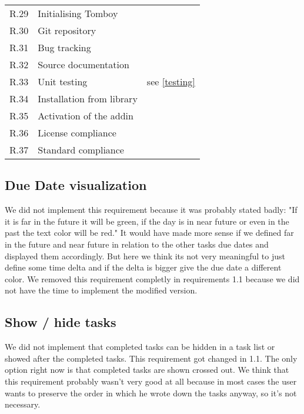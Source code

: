 \begin{tabular}{lll}
\completed	R.29	& Initialising Tomboy & \\
\completed	R.30	& Git repository & \\
\completed	R.31	& Bug tracking & \\
\completed	R.32	& Source documentation & \\
\parts		R.33	& Unit testing & see \ref{testing}\\
\completed	R.34	& Installation from library & \\
\completed	R.35	& Activation of the addin & \\
\completed	R.36	& License compliance & \\
\completed	R.37	& Standard compliance & \\
\end{tabular}


\subsection{Due Date visualization}
\label{visualduedate}
We did not implement this requirement because it was probably stated badly:
"If it is far in the future it will be green, if the day is in near future or even in the past the text color will be red."
It would have made more sense if we defined far in the future and near future in relation to the other tasks due dates and displayed them accordingly. But here we think its not very meaningful to just define some time delta and if the delta is bigger give the due date a different color. We removed this requirement completly in requirements 1.1 because we did not have the time to implement the modified version.

\subsection{Show / hide tasks}
\label{showhidetasks}
We did not implement that completed tasks can be hidden in a task list or showed after the completed tasks. This requirement got changed in 1.1. The only option right now is that completed tasks are shown crossed out. We think that this requirement probably wasn't very good at all because in most cases the user wants to preserve the order in which he wrote down the tasks anyway, so it's not necessary.

